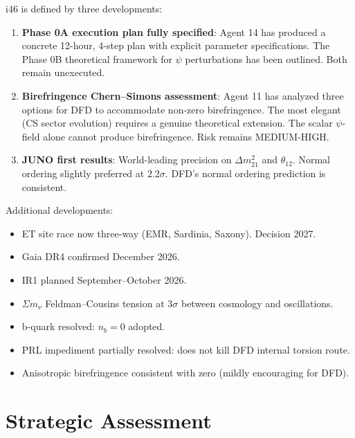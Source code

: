 \documentclass[11pt,a4paper]{article}
\begin{document}
\begin{tcolorbox}[colback=yellow!5!white, colframe=yellow!60!black,
  title={i46: Phase 0A Plans Refined, Birefringence Assessed, JUNO Delivers}]

i46 is defined by three developments:

\begin{enumerate}
\item \textbf{Phase 0A execution plan fully specified}: Agent 14 has produced a concrete 12-hour, 4-step plan with explicit parameter specifications. The Phase 0B theoretical framework for $\psi$ perturbations has been outlined. Both remain unexecuted.

\item \textbf{Birefringence Chern--Simons assessment}: Agent 11 has analyzed three options for DFD to accommodate non-zero birefringence. The most elegant (CS sector evolution) requires a genuine theoretical extension. The scalar $\psi$-field alone cannot produce birefringence. Risk remains MEDIUM-HIGH.

\item \textbf{JUNO first results}: World-leading precision on $\Delta m^2_{21}$ and $\theta_{12}$. Normal ordering slightly preferred at $2.2\sigma$. DFD's normal ordering prediction is consistent.
\end{enumerate}

Additional developments:
\begin{itemize}
\item ET site race now three-way (EMR, Sardinia, Saxony). Decision 2027.
\item Gaia DR4 confirmed December 2026.
\item IR1 planned September--October 2026.
\item $\Sigma m_\nu$ Feldman--Cousins tension at $3\sigma$ between cosmology and oscillations.
\item b-quark resolved: $n_b = 0$ adopted.
\item PRL impediment partially resolved: does not kill DFD internal torsion route.
\item Anisotropic birefringence consistent with zero (mildly encouraging for DFD).
\end{itemize}
\end{tcolorbox}

\section{Strategic Assessment}
\end{document}
